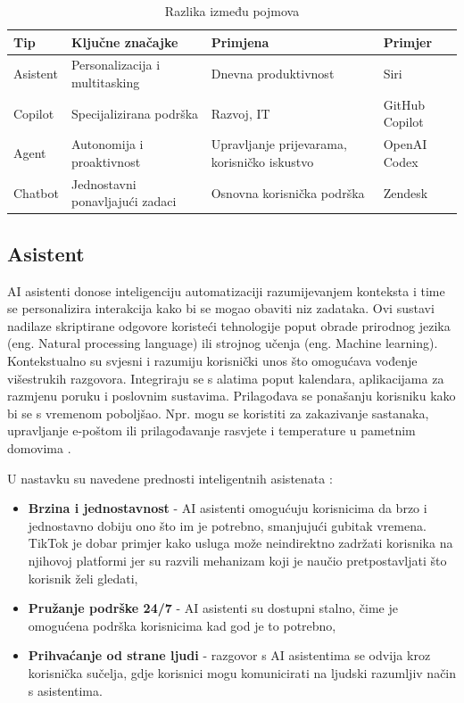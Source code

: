 \documentclass[]{foi}
\begin{document}
\begin{table}[h!]
\centering
\begin{tabularx}{\textwidth}{|l|X|X|X|}
\hline
\textbf{Tip}    & \textbf{Ključne značajke}         & \textbf{Primjena}                              & \textbf{Primjer}             \\
\hline
Asistent        & Personalizacija i multitasking    & Dnevna produktivnost                           & Siri         \\
\hline
Copilot         & Specijalizirana podrška           & Razvoj, IT                                     & GitHub Copilot                \\
\hline
Agent           & Autonomija i proaktivnost         & Upravljanje prijevarama, korisničko iskustvo   & OpenAI Codex                  \\
\hline
Chatbot         & Jednostavni ponavljajući zadaci   & Osnovna korisnička podrška                     & Zendesk                       \\
\hline
\end{tabularx}
\caption{Razlika između pojmova \cite{exomindset2025difference}}
\label{tab:chatbot_usporedba}
\end{table}
\newpage

\subsection{Asistent}

AI asistenti donose inteligenciju automatizaciji razumijevanjem konteksta i time se personalizira interakcija kako bi se mogao obaviti niz zadataka. Ovi sustavi nadilaze skriptirane odgovore
koristeći tehnologije poput obrade prirodnog jezika (eng. Natural processing language) ili strojnog učenja (eng. Machine learning). Kontekstualno su svjesni i razumiju korisnički unos što omogućava
vođenje višestrukih razgovora. Integriraju se s alatima poput kalendara, aplikacijama za razmjenu poruku i poslovnim sustavima. Prilagođava se ponašanju korisniku kako bi se s vremenom poboljšao.
Npr. mogu se koristiti za zakazivanje sastanaka, upravljanje e-poštom ili prilagođavanje rasvjete i temperature u pametnim domovima \cite{exomindset2025difference}.

U nastavku su navedene prednosti inteligentnih asistenata \cite{buchan2024ai}:
\begin{itemize}
    \item \textbf{Brzina i jednostavnost} - AI asistenti omogućuju korisnicima da brzo i jednostavno dobiju ono što im je potrebno, smanjujući
    gubitak vremena. TikTok je dobar primjer kako usluga može neindirektno zadržati korisnika na njihovoj platformi jer su razvili mehanizam koji
    je naučio pretpostavljati što korisnik želi gledati,
    \item \textbf{Pružanje podrške 24/7} - AI asistenti su dostupni stalno, čime je omogućena podrška korisnicima kad god je to potrebno, 
    \item \textbf{Prihvaćanje od strane ljudi} - razgovor s AI asistentima se odvija kroz korisnička sučelja, gdje korisnici mogu
    komunicirati na ljudski razumljiv način s asistentima. 
\end{itemize}
\end{document}
